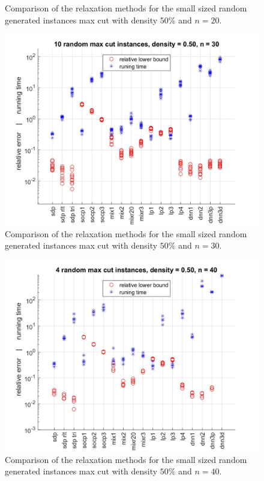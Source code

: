 \documentclass[12pt]{book}
\theoremstyle{definition}
\begin{document}
\begin{center}
\begin{figure}
\caption[Comparison of relaxations - small, dense instances of max cut 1]{Comparison of the relaxation methods for the small sized random generated instances max cut with density $50\%$ and $n=20$.}
\label{comp0_d50_n20}
\end{figure}
\end{center}


\begin{center}
\begin{figure}
\includegraphics[scale = 0.27]{img/comp0_d50_n30.jpg}
\caption[Comparison of relaxations - small, dense instances of max cut 2]{Comparison of the relaxation methods for the small sized random generated instances max cut with density $50\%$ and $n=30$.}
\label{comp0_d50_n30}
\end{figure}
\begin{figure}
\includegraphics[scale=0.27]{img/comp0_d50_n40.jpg}
\caption[Comparison of relaxations - small, dense instances of max cut 3]{Comparison of the relaxation methods for the small sized random generated instances max cut with density  $50\%$ and $n=40$.}
\label{comp0_d50_n40}
\end{figure}
\end{center}
\end{document}
